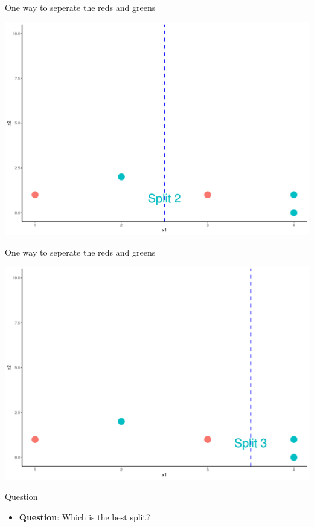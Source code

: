 \documentclass[
  ignorenonframetext,
]{beamer}
\providecommand{\tightlist}{%
  \setlength{\itemsep}{0pt}\setlength{\parskip}{0pt}}
\begin{document}
\begin{frame}{One way to seperate the reds and greens}
\protect\hypertarget{one-way-to-seperate-the-reds-and-greens-1}{}

\includegraphics{fa_classification_tree_files/figure-beamer/unnamed-chunk-3-1.pdf}

\end{frame}

\begin{frame}{One way to seperate the reds and greens}
\protect\hypertarget{one-way-to-seperate-the-reds-and-greens-2}{}

\includegraphics{fa_classification_tree_files/figure-beamer/unnamed-chunk-4-1.pdf}

\end{frame}

\begin{frame}{Question}
\protect\hypertarget{question}{}

\begin{itemize}
\tightlist
\item
  \textbf{Question}: Which is the best split?
\end{itemize}

\end{frame}
\end{document}
